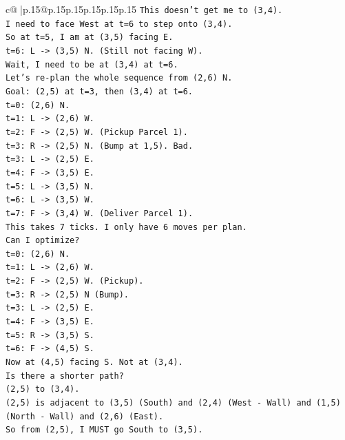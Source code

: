\documentclass{article}
\begin{document}
{\begin{supertabular}{c@{$\;$}|p{.15\linewidth}@{}p{.15\linewidth}p{.15\linewidth}p{.15\linewidth}p{.15\linewidth}p{.15\linewidth}}
{{{\texttt{This doesn't get me to (3,4).} \\
\texttt{I need to face West at t=6 to step onto (3,4).} \\
\texttt{So at t=5, I am at (3,5) facing E.} \\
\texttt{t=6: L {-}> (3,5) N. (Still not facing W).} \\
\texttt{Wait, I need to be at (3,4) at t=6.} \\
\texttt{Let's re{-}plan the whole sequence from (2,6) N.} \\
\texttt{Goal: (2,5) at t=3, then (3,4) at t=6.} \\
\texttt{t=0: (2,6) N.} \\
\texttt{t=1: L {-}> (2,6) W.} \\
\texttt{t=2: F {-}> (2,5) W. (Pickup Parcel 1).} \\
\texttt{t=3: R {-}> (2,5) N. (Bump at 1,5). Bad.} \\
\texttt{t=3: L {-}> (2,5) E.} \\
\texttt{t=4: F {-}> (3,5) E.} \\
\texttt{t=5: L {-}> (3,5) N.} \\
\texttt{t=6: L {-}> (3,5) W.} \\
\texttt{t=7: F {-}> (3,4) W. (Deliver Parcel 1).} \\
\texttt{This takes 7 ticks. I only have 6 moves per plan.} \\
\texttt{Can I optimize?} \\
\texttt{t=0: (2,6) N.} \\
\texttt{t=1: L {-}> (2,6) W.} \\
\texttt{t=2: F {-}> (2,5) W. (Pickup).} \\
\texttt{t=3: R {-}> (2,5) N (Bump).} \\
\texttt{t=3: L {-}> (2,5) E.} \\
\texttt{t=4: F {-}> (3,5) E.} \\
\texttt{t=5: R {-}> (3,5) S.} \\
\texttt{t=6: F {-}> (4,5) S.} \\
\texttt{Now at (4,5) facing S. Not at (3,4).} \\
\texttt{Is there a shorter path?} \\
\texttt{(2,5) to (3,4).} \\
\texttt{(2,5) is adjacent to (3,5) (South) and (2,4) (West {-} Wall) and (1,5) (North {-} Wall) and (2,6) (East).} \\
\texttt{So from (2,5), I MUST go South to (3,5).} \\
}}}
\end{supertabular}}
\end{document}
